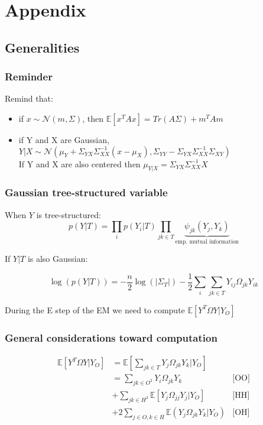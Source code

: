 \documentclass[11pt,a4paper]{article}
\newcommand{\Esp}{\mathds{E}}
\begin{document}
\newpage
\section{Appendix}

\subsection{Generalities}


\subsubsection{Reminder}
Remind that:
\begin{itemize}
\item if $x\sim\mathcal{N}(m, \Sigma)$, then
$\Esp[x^TAx] = Tr(A\Sigma) + m^TAm$
\item if Y and X are Gaussian, $Y|X \sim \mathcal{N}(\mu_Y+\Sigma_{YX}\Sigma_{XX}^{-1}(x-\mu_X) , \Sigma_{YY} - \Sigma_{YX}\Sigma_{XX}^{-1}\Sigma_{XY})$\\
If Y and X are also centered then $\mu_{Y|X} = \Sigma_{YX}\Sigma_{XX}^{-1} X$
\end{itemize}


\subsubsection{Gaussian tree-structured variable}
When $Y$ is tree-structured:
$$ p(Y|T) = \prod_i  p(Y_i|T) \prod_{jk\in T} \underbrace{\psi_{jk}(Y_j,Y_k)}_{\text{emp. mutual  information}}$$

If $Y|T$ is also Gaussian:

$$\log(p(Y|T)) = -\frac{n}{2}\log(|\Sigma_T|) - \frac{1}{2} \sum_i\sum_{jk\in T} Y_{ij} \Omega_{jk} Y_{ik}$$

During the E step of the EM we need to compute $\Esp[Y^T\Omega Y|Y_O]$
\subsubsection{General considerations toward computation}
\begin{align*}
 \Esp[Y^T\Omega Y|Y_O] &=\Esp\left[\sum_{jk\in T } Y_j\Omega_{jk}Y_k|Y_O\right]&\\
& = \sum_{jk\in O^2} Y_i\Omega_{jk} Y_k & \text{[OO]}\\
&+\sum_{jk \in H^2} \Esp[Y_j\Omega_{jj}Y_j|Y_O] & \text{[HH]} \\
&+2 \sum_{j\in O, k \in H} \Esp(Y_j\Omega_{jk} Y_k |Y_O) & \text{[OH]}\\
\end{align*}
\end{document}
